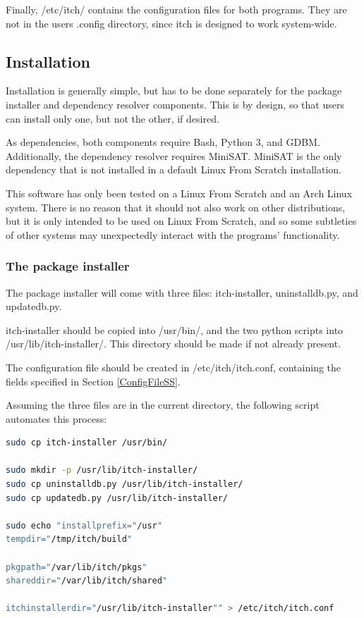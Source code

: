\documentclass[10pt]{article}
\begin{document}
Finally, /etc/itch/ contains the configuration files for both programs. They are not in the users .config directory, since itch is designed to work system-wide.

\subsection{Installation}

Installation is generally simple, but has to be done separately for the package installer and dependency resolver components. This is by design, so that users can install only one, but not the other, if desired.

As dependencies, both components require Bash, Python 3, and GDBM. Additionally, the dependency resolver requires MiniSAT. MiniSAT is the only dependency that is not installed in a default Linux From Scratch installation.

This software has only been tested on a Linux From Scratch and an Arch Linux system. There is no reason that it should not also work on other distributions, but it is only intended to be used on Linux From Scratch, and so some subtleties of other systems may unexpectedly interact with the programs' functionality.

\subsubsection{The package installer}

The package installer will come with three files: itch-installer, uninstalldb.py, and updatedb.py.

itch-installer should be copied into /usr/bin/, and the two python scripts into /usr/lib/itch-installer/. This directory should be made if not already present.

The configuration file should be created in /etc/itch/itch.conf, containing the fields specified in Section \ref{ConfigFileSS}.

Assuming the three files are in the current directory, the following script automates this process:

\begin{lstlisting}[language=bash]
sudo cp itch-installer /usr/bin/

sudo mkdir -p /usr/lib/itch-installer/
sudo cp uninstalldb.py /usr/lib/itch-installer/
sudo cp updatedb.py /usr/lib/itch-installer/

sudo echo "installprefix="/usr"
tempdir="/tmp/itch/build"

pkgpath="/var/lib/itch/pkgs"
shareddir="/var/lib/itch/shared"

itchinstallerdir="/usr/lib/itch-installer"" > /etc/itch/itch.conf
\end{lstlisting}
\end{document}
